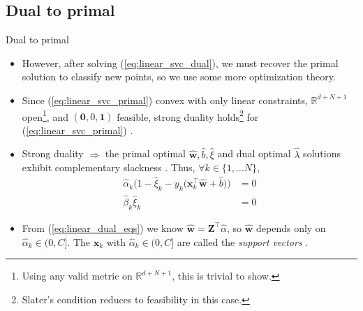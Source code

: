 \documentclass{beamer}
\numberwithin{equation}{section}
\newcommand{\aref}[1]{\alert{\ref{#1}}}
\begin{document}
\subsection{Dual to primal}

\begin{frame}{Dual to primal}
    \begin{itemize}
        \item
        However, after solving (\aref{eq:linear_svc_dual}), we must recover
        the primal solution to classify new points, so we use some more
        optimization theory.

        \item
        Since (\aref{eq:linear_svc_primal}) convex with only linear
        constraints, $ \mathbb{R}^{d + N + 1} $ open\footnote{
            Using any valid metric on $ \mathbb{R}^{d + N + 1} $, this is
            trivial to show.
        }, and
        $ (\mathbf{0}, 0, \mathbf{1}) $ feasible, strong duality
        holds\footnote{
            Slater's condition reduces to feasibility in this case.
        } for (\aref{eq:linear_svc_primal})
        \cite{bv_convex_opt}.

        \item
        Strong duality $ \Rightarrow $ the primal optimal $ \hat{\mathbf{w}},
        \hat{b}, \hat{\xi} $ and dual optimal $ \hat{\lambda} $ solutions
        exhibit complementary slackness \cite{bv_convex_opt}. Thus,
        $ \forall k \in \{1, \ldots N\} $,
        \begin{equation} \label{eq:dual_compl_slack}
            \begin{split}
                \hat{\alpha}_k\big(
                    1 - \hat{\xi}_k - y_k\big(
                        \mathbf{x}_k^\top\hat{\mathbf{w}} + \hat{b}
                    \big)
                \big) & = 0 \\
                \hat{\beta}_k\hat{\xi}_k & = 0
            \end{split}
        \end{equation}

        \item
        From (\aref{eq:linear_dual_eqs}) we know
        $ \hat{\mathbf{w}} = \mathbf{Z}^\top\hat{\alpha} $, so
        $ \hat{\mathbf{w}} $ depends only on $ \hat{\alpha}_k \in (0, C] $.
        The $ \mathbf{x}_k $ with $ \hat{\alpha}_k \in (0, C] $ are called 
        the \textit{support vectors} \cite{esl}.
    \end{itemize}

    \medskip
\end{frame}
\end{document}
